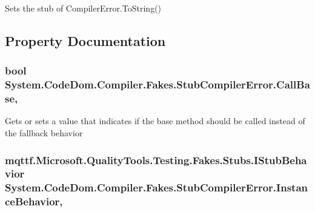 Sets the stub of Compiler\-Error.\-To\-String()



\subsection{Property Documentation}
\hypertarget{class_system_1_1_code_dom_1_1_compiler_1_1_fakes_1_1_stub_compiler_error_aa108fa830ceedfa9322638f34c5fa9ea}{
\subsubsection[{Call\-Base}]{\setlength{\rightskip}{0pt plus 5cm}bool System.\-Code\-Dom.\-Compiler.\-Fakes.\-Stub\-Compiler\-Error.\-Call\-Base\hspace{0.3cm}{\ttfamily [get]}, {\ttfamily [set]}}}\label{class_system_1_1_code_dom_1_1_compiler_1_1_fakes_1_1_stub_compiler_error_aa108fa830ceedfa9322638f34c5fa9ea}


Gets or sets a value that indicates if the base method should be called instead of the fallback behavior

\hypertarget{class_system_1_1_code_dom_1_1_compiler_1_1_fakes_1_1_stub_compiler_error_ab015a97eb6c6c8eb1ee63805430b3a48}{
\subsubsection[{Instance\-Behavior}]{\setlength{\rightskip}{0pt plus 5cm}mqttf.\-Microsoft.\-Quality\-Tools.\-Testing.\-Fakes.\-Stubs.\-I\-Stub\-Behavior System.\-Code\-Dom.\-Compiler.\-Fakes.\-Stub\-Compiler\-Error.\-Instance\-Behavior\hspace{0.3cm}{\ttfamily [get]}, {\ttfamily [set]}}}\label{class_system_1_1_code_dom_1_1_compiler_1_1_fakes_1_1_stub_compiler_error_ab015a97eb6c6c8eb1ee63805430b3a48}


